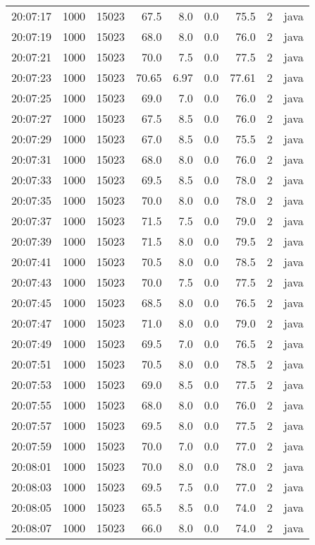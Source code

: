 \documentclass[11pt]{article}
\begin{document}
\begin{table}[htbp]
\begin{tabular}{rrrrrrrrl}
20:07:17 & 1000 & 15023 & 67.5 & 8.0 & 0.0 & 75.5 & 2 & java\\
20:07:19 & 1000 & 15023 & 68.0 & 8.0 & 0.0 & 76.0 & 2 & java\\
20:07:21 & 1000 & 15023 & 70.0 & 7.5 & 0.0 & 77.5 & 2 & java\\
20:07:23 & 1000 & 15023 & 70.65 & 6.97 & 0.0 & 77.61 & 2 & java\\
20:07:25 & 1000 & 15023 & 69.0 & 7.0 & 0.0 & 76.0 & 2 & java\\
20:07:27 & 1000 & 15023 & 67.5 & 8.5 & 0.0 & 76.0 & 2 & java\\
20:07:29 & 1000 & 15023 & 67.0 & 8.5 & 0.0 & 75.5 & 2 & java\\
20:07:31 & 1000 & 15023 & 68.0 & 8.0 & 0.0 & 76.0 & 2 & java\\
20:07:33 & 1000 & 15023 & 69.5 & 8.5 & 0.0 & 78.0 & 2 & java\\
20:07:35 & 1000 & 15023 & 70.0 & 8.0 & 0.0 & 78.0 & 2 & java\\
20:07:37 & 1000 & 15023 & 71.5 & 7.5 & 0.0 & 79.0 & 2 & java\\
20:07:39 & 1000 & 15023 & 71.5 & 8.0 & 0.0 & 79.5 & 2 & java\\
20:07:41 & 1000 & 15023 & 70.5 & 8.0 & 0.0 & 78.5 & 2 & java\\
20:07:43 & 1000 & 15023 & 70.0 & 7.5 & 0.0 & 77.5 & 2 & java\\
20:07:45 & 1000 & 15023 & 68.5 & 8.0 & 0.0 & 76.5 & 2 & java\\
20:07:47 & 1000 & 15023 & 71.0 & 8.0 & 0.0 & 79.0 & 2 & java\\
20:07:49 & 1000 & 15023 & 69.5 & 7.0 & 0.0 & 76.5 & 2 & java\\
20:07:51 & 1000 & 15023 & 70.5 & 8.0 & 0.0 & 78.5 & 2 & java\\
20:07:53 & 1000 & 15023 & 69.0 & 8.5 & 0.0 & 77.5 & 2 & java\\
20:07:55 & 1000 & 15023 & 68.0 & 8.0 & 0.0 & 76.0 & 2 & java\\
20:07:57 & 1000 & 15023 & 69.5 & 8.0 & 0.0 & 77.5 & 2 & java\\
20:07:59 & 1000 & 15023 & 70.0 & 7.0 & 0.0 & 77.0 & 2 & java\\
20:08:01 & 1000 & 15023 & 70.0 & 8.0 & 0.0 & 78.0 & 2 & java\\
20:08:03 & 1000 & 15023 & 69.5 & 7.5 & 0.0 & 77.0 & 2 & java\\
20:08:05 & 1000 & 15023 & 65.5 & 8.5 & 0.0 & 74.0 & 2 & java\\
20:08:07 & 1000 & 15023 & 66.0 & 8.0 & 0.0 & 74.0 & 2 & java\\

\end{tabular}
\end{table}
\end{document}
